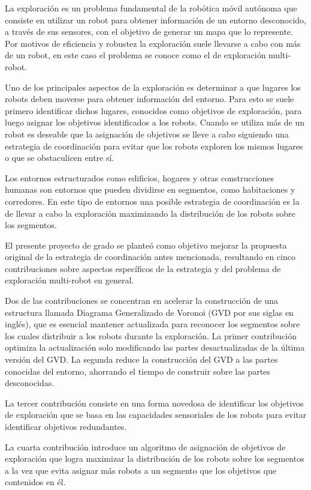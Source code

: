La exploración es un problema fundamental de la robótica móvil autónoma que
consiste en utilizar un robot para obtener información de un entorno
desconocido, a través de sus sensores, con el objetivo de generar un mapa que lo
represente. Por motivos de eficiencia y robustez la exploración suele llevarse
a cabo con más de un robot, en este caso el problema se conoce como el de
exploración multi-robot.

Uno de los principales aspectos de la exploración es determinar a que lugares
los robots deben moverse para obtener información del entorno. Para esto se
suele primero identificar dichos lugares, conocidos como objetivos de
exploración, para luego asignar los objetivos identificados a los robots.
Cuando se utiliza más de un robot es deseable que la asignación de objetivos se
lleve a cabo siguiendo una estrategia de coordinación para evitar que los
robots exploren los mismos lugares o que se obstaculicen entre sí.

Los entornos estructurados como edificios, hogares y otras construcciones
humanas son entornos que pueden dividirse en segmentos, como habitaciones
y corredores. En este tipo de entornos una posible estrategia de coordinación 
es la de llevar a cabo la exploración maximizando la distribución de los
robots sobre los segmentos. 

El presente proyecto de grado se planteó como objetivo mejorar la propuesta
original de la estrategia de coordinación antes mencionada, resultando en cinco
contribuciones sobre aspectos específicos de la estrategia y del problema de
exploración multi-robot en general.

Dos de las contribuciones se concentran en acelerar la construcción de una
estructura llamada Diagrama Generalizado de Voronoi (GVD por sus siglas en
inglés), que es esencial mantener actualizada para reconocer los segmentos
sobre los cuales distribuir a los robots durante la exploración. La primer
contribución optimiza la actualización solo modificando las partes desactualizadas 
de la última versión del GVD. La segunda reduce la construcción del GVD a las
partes conocidas del entorno, ahorrando el tiempo de construir sobre las
partes desconocidas.

La tercer contribución consiste en una forma novedosa de identificar los objetivos de exploración
que se basa en las capacidades sensoriales de los robots para evitar
identificar objetivos redundantes.

La cuarta contribución introduce un algoritmo de asignación de objetivos de exploración
que logra maximizar la distribución de los robots sobre los segmentos a la vez que evita
asignar más robots a un segmento que los objetivos que contenidos en él.

